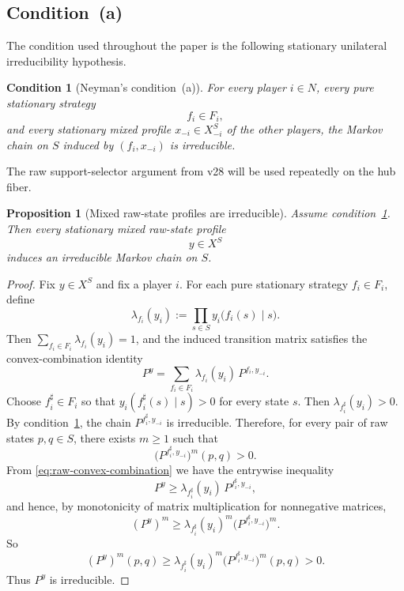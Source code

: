 \documentclass[11pt]{article}
\newtheorem{proposition}[theorem]{Proposition}
\newtheorem{condition}[theorem]{Condition}
\theoremstyle{definition}
\newcommand{\1}{\mathbf{1}}
\begin{document}
\subsection{Condition~(a)}

The condition used throughout the paper is the following stationary unilateral irreducibility hypothesis.

\begin{condition}[Neyman's condition~(a)]\label{cond:a}
For every player $i\in N$, every pure stationary strategy
\[
f_i\in F_i,
\]
and every stationary mixed profile $x_{-i}\in X_{-i}^S$ of the other players, the Markov chain on $S$ induced by $(f_i,x_{-i})$ is irreducible.
\end{condition}

The raw support-selector argument from v28 will be used repeatedly on the hub fiber.

\begin{proposition}[Mixed raw-state profiles are irreducible]\label{prop:raw-mixed-irreducible}
Assume condition~\ref{cond:a}. Then every stationary mixed raw-state profile
\[
y\in X^S
\]
induces an irreducible Markov chain on $S$.
\end{proposition}

\begin{proof}
Fix $y\in X^S$ and fix a player $i$. For each pure stationary strategy $f_i\in F_i$, define
\[
\lambda_{f_i}(y_i):=\prod_{s\in S}y_i\bigl(f_i(s)\mid s\bigr).
\]
Then $\sum_{f_i\in F_i}\lambda_{f_i}(y_i)=1$, and the induced transition matrix satisfies the convex-combination identity
\begin{equation}\label{eq:raw-convex-combination}
P^y=\sum_{f_i\in F_i}\lambda_{f_i}(y_i)\,P^{f_i,y_{-i}}.
\end{equation}
Choose $f_i^\sharp\in F_i$ so that $y_i(f_i^\sharp(s)\mid s)>0$ for every state $s$. Then $\lambda_{f_i^\sharp}(y_i)>0$. By condition~\ref{cond:a}, the chain $P^{f_i^\sharp,y_{-i}}$ is irreducible. Therefore, for every pair of raw states $p,q\in S$, there exists $m\ge1$ such that
\[
\bigl(P^{f_i^\sharp,y_{-i}}\bigr)^m(p,q)>0.
\]
From \eqref{eq:raw-convex-combination} we have the entrywise inequality
\[
P^y\ge \lambda_{f_i^\sharp}(y_i)\,P^{f_i^\sharp,y_{-i}},
\]
and hence, by monotonicity of matrix multiplication for nonnegative matrices,
\[
(P^y)^m\ge \lambda_{f_i^\sharp}(y_i)^m\bigl(P^{f_i^\sharp,y_{-i}}\bigr)^m.
\]
So
\[
(P^y)^m(p,q)
\ge
\lambda_{f_i^\sharp}(y_i)^m\bigl(P^{f_i^\sharp,y_{-i}}\bigr)^m(p,q)
>
0.
\]
Thus $P^y$ is irreducible.
\end{proof}
\end{document}

